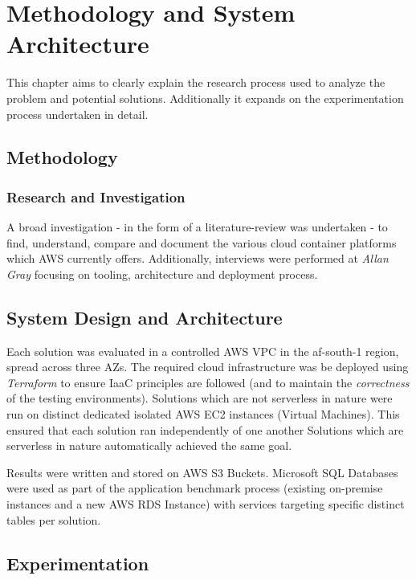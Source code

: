 \part{Methodology and System Architecture}

This chapter aims to clearly explain the research process used to analyze the problem and potential solutions.
Additionally it expands on the experimentation process undertaken in detail.

\chapter{Methodology}

\section{Research and Investigation}

A broad investigation - in the form of a literature-review was undertaken - to find, understand, compare and document the various cloud container platforms which AWS currently offers.
Additionally, interviews were performed at \textit{Allan Gray} focusing on tooling, architecture and deployment process.

\chapter{System Design and Architecture}

Each solution was evaluated in a controlled AWS VPC in the af-south-1 region, spread across three AZs.
The required cloud infrastructure was be deployed using \textit{Terraform} to ensure IaaC principles are followed (and to maintain the \emph{correctness} of the testing environments).
Solutions which are not serverless in nature were run on distinct dedicated isolated AWS EC2 instances (Virtual Machines). This ensured that each solution ran independently of one another
Solutions which are serverless in nature automatically achieved the same goal.

Results were written and stored on AWS S3 Buckets.
Microsoft SQL Databases were used as part of the application benchmark process (existing on-premise instances and a new AWS RDS Instance) with services targeting specific distinct tables per solution.

\chapter{Experimentation}

